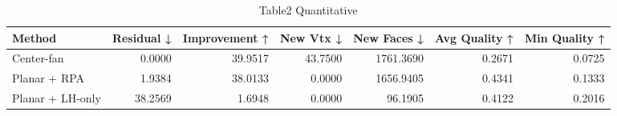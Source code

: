 \begin{table}
\caption{Table2 Quantitative}
\label{tab:table2_quantitative}
\begin{tabular}{lrrrrrr}
\toprule
Method & Residual ↓ & Improvement ↑ & New Vtx ↓ & New Faces ↓ & Avg Quality ↑ & Min Quality ↑ \\
\midrule
Center-fan & 0.0000 & 39.9517 & 43.7500 & 1761.3690 & 0.2671 & 0.0725 \\
Planar + RPA & 1.9384 & 38.0133 & 0.0000 & 1656.9405 & 0.4341 & 0.1333 \\
Planar + LH-only & 38.2569 & 1.6948 & 0.0000 & 96.1905 & 0.4122 & 0.2016 \\
\bottomrule
\end{tabular}
\end{table}

